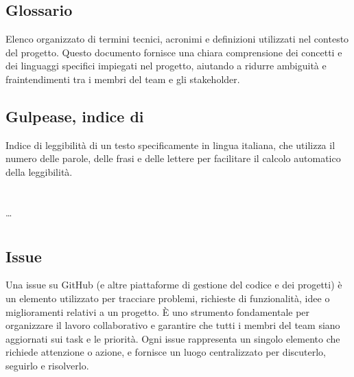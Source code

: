 \subsection*{Glossario}
Elenco organizzato di termini tecnici, acronimi e definizioni utilizzati nel contesto del progetto. Questo documento fornisce una chiara comprensione dei 
concetti e dei linguaggi specifici impiegati nel progetto, aiutando a ridurre ambiguità e fraintendimenti tra i membri del team e gli stakeholder.

\subsection*{Gulpease, indice di}
Indice di leggibilità di un testo specificamente in lingua italiana, che utilizza il numero delle parole, delle frasi e delle lettere per facilitare il 
calcolo automatico della leggibilità.

\newpage



\section{}

\dots

\newpage



\section{}

\subsection*{Issue}
Una issue su GitHub (e altre piattaforme di gestione del codice e dei progetti) è un elemento utilizzato per tracciare problemi, richieste di funzionalità, 
idee o miglioramenti relativi a un progetto. È uno strumento fondamentale per organizzare il lavoro collaborativo e garantire che tutti i membri del team 
siano aggiornati sui task e le priorità. Ogni issue rappresenta un singolo elemento che richiede attenzione o azione, e fornisce un luogo centralizzato per 
discuterlo, seguirlo e risolverlo.

\newpage